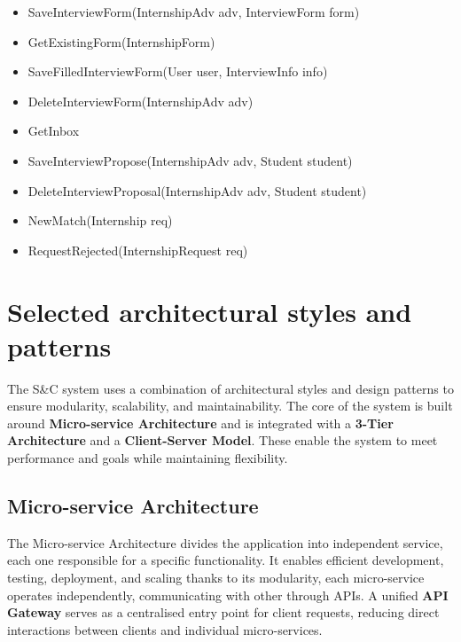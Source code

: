 \begin{itemize}
\begin{itemize}
            \item SaveInterviewForm(InternshipAdv adv, InterviewForm form)
            \item GetExistingForm(InternshipForm)
            \item SaveFilledInterviewForm(User user, InterviewInfo info)
            \item DeleteInterviewForm(InternshipAdv adv)
            \item GetInbox
            \item SaveInterviewPropose(InternshipAdv adv, Student student)
            \item DeleteInterviewProposal(InternshipAdv adv, Student student)
            \item NewMatch(Internship req)
            \item RequestRejected(InternshipRequest req)
        \end{itemize}   
\end{itemize}

\section{Selected architectural styles and patterns}
\label{subsec: 2.6 Selected architectural styles and patterns}
The S\&C system uses a combination of architectural styles and design patterns to ensure modularity, scalability, and maintainability. The core of the system is built around \textbf{Micro-service Architecture} and is integrated with a \textbf{3-Tier Architecture} and a \textbf{Client-Server Model}. These enable the system to meet performance and goals while maintaining flexibility.
\subsection{Micro-service Architecture}
The Micro-service Architecture divides the application into independent service, each one responsible for a specific functionality. It enables efficient development, testing, deployment, and scaling thanks to its modularity, each micro-service operates independently, communicating with other through APIs. A unified \textbf{API Gateway} serves as a centralised entry point for client requests, reducing direct interactions between clients and individual micro-services.
